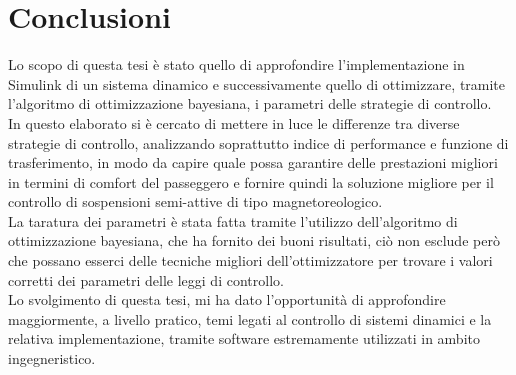 \chapter{Conclusioni}
\label{cha:conclusioni}
Lo scopo di questa tesi è stato quello di approfondire l'implementazione in Simulink di un sistema dinamico e successivamente quello di ottimizzare, tramite l'algoritmo di ottimizzazione bayesiana, i parametri delle strategie di controllo.\\

In questo elaborato si è cercato di mettere in luce le differenze tra diverse strategie di controllo, analizzando soprattutto indice di performance e funzione di trasferimento, in modo da capire quale possa garantire delle prestazioni migliori in termini di comfort del passeggero e fornire quindi la soluzione migliore per il controllo di sospensioni semi-attive di tipo magnetoreologico.\\
La taratura dei parametri è stata fatta tramite l'utilizzo dell'algoritmo di ottimizzazione bayesiana, che ha fornito dei buoni risultati, ciò non esclude però che possano esserci delle tecniche migliori dell'ottimizzatore per trovare i valori corretti dei parametri delle leggi di controllo.\\

Lo svolgimento di questa tesi, mi ha dato l'opportunità di approfondire maggiormente, a livello pratico, temi legati al controllo di sistemi dinamici e la relativa implementazione, tramite software estremamente utilizzati in ambito ingegneristico.